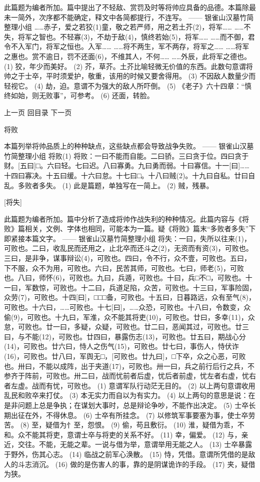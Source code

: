 \documentclass[12pt,UTF8]{ctexbook}
\begin{document}
此篇题为编者所加。篇中提出了不轻敌、赏罚及时等将帅应具备的品德。本篇除最未一简外，次序都不能确定，释文中各简都提行，不连写。
—— 银雀山汉墓竹简整理小组
……赤子，爱之若狡(1)童，敬之若严师，用之若土芥(2)，将军……
……不失，将军之智也。不轻寡(3)，不劫于敌(4)，慎终若始(5)，将军……
……而不御，君令不入军门，将军之恒也。入军……
……将不两生，军不两存，将军之……
……将军之惠也。赏不逾日，罚不还面(6)，不维其人，不何……
……外辰，此将军之德也。
(1) 狡，年少而美好。
(2) 芥，草芥。土芥比喻轻微无价值的东西。此数句意谓将帅之于士卒，平时须爱护，敬重，该用的时候又要舍得用。
(3) 不因敌人数量少而轻视它。
(4) 劫，迫。意谓不为强大的敌人所吓倒。
(5) 《老子》六十四章：“慎终如始，则无败事”，可参考。
(6) 还面，转脸。

上一页 回目录 下一页

将败

本篇列举将帅品质上的种种缺点，这些缺点都会导致战争失败。
—— 银雀山汉墓竹简整理小组
将败(1)
将败：一曰不能而自能。二曰骄。三曰贪于位。四曰贪于财。[五曰]□。六曰轻。七曰迟。八曰寡勇。九曰勇而弱。十曰寡信。十一[曰]……十四曰寡决。十五曰缓。十六曰怠。十七曰□。十八曰贼(2)。十九曰自私。廿曰自乱。多败者多失。
(1) 此是篇题，单独写在一简上。
(2) 贼，残暴。

[将失]

此篇题为编者所加。篇中分析了造成将帅作战失利的种种情况。此篇内容与《将败》篇相关，文例、字体也相同，可能本为一篇。疑《将败》篇末“多败者多失”下即紧接本篇文字。
—— 银雀山汉墓竹简整理小组
将失：一曰，失所以往来(1)，可败也。二曰，收乱民而还用之，止北卒而还斗之(2)，无资而有资(3)，可败也。三曰，是非争，谋事辩讼(4)，可败也。四曰，令不行，众不壹，可败也。五曰，下不服，众不为用，可败也。六曰，民苦其师，可败也。七曰，师老(5)，可败也。八曰，师怀(6)，可败也。九曰，兵遁，可败也。十曰，兵□不□，可败也。十一曰，军数惊，可败也。十二曰，兵道足陷，众苦，可败也。十三曰，军事险固，众劳(7)，可败也。十四[曰]，□□□备，可败也。十五曰，日暮路远，众有至气(8)，可败也。十六曰，……可败也。十七[曰]，……众恐，可败也。十八曰，令数变，众偷(9)，可败也。十九曰，军淮，众不能其将吏(10)，可败也。廿曰，多幸(11)，众怠，可败也。廿一曰，多疑，众疑，可败也。廿二曰，恶闻其过，可败也。廿三曰，与不能(12)，可败也。廿四曰，暴露伤志(13)，可败也。廿五曰，期战心分(14)，可败也。廿六曰，恃人之伤气(15)，可败也。廿七曰，事伤人，恃伏诈(16)，可败也。廿八曰，军舆无□，[可败也。廿九曰]，□下卒，众之心恶，可败也。卅曰，不能以成阵，出于夹道(17)，可败也。卅一曰，兵之前行后行之兵，不参齐于阵前，可败也。卅二曰，战而忧前者后虚，忧后者前虚，忧左者右虚，忧右者左虚。战而有忧，可败也。
(1) 意谓军队行动茫无目的。
(2) 以上两句意谓收用乱民和败卒来打仗。
(3) 本无实力而自以为有实力。
(4) 以上两句的意思是说：在是非问题上总是争执；在谋划大事时，总是辩论争吵，不能作出决定。
(5) 士卒长期出征在外，不得休息。
(6) 士卒有所挂念。
(7) 以修筑军事要塞为事，使士卒劳苦。
(8) 至，疑借为{忄至}，怨恨。
(9) 偷，苟且敷衍。
(10) 淮，疑借为乖，不和。众不能其将吏，意谓士卒与将吏的关系不好。
(11) 幸，偏爱。
(12) 与，亲近，交往。不能，无能之辈。一说与借为举，意谓举用无能之人。
(13) 士卒暴露于野外，伤其心志。
(14) 临战之前军心涣散。
(15) 恃，凭借。意谓所凭借的是敌人的斗志消沉。
(16) 做的是伤害人的事，靠的是阴谋诡诈的手段。
(17) 夹，疑借为狭。
\end{document}
